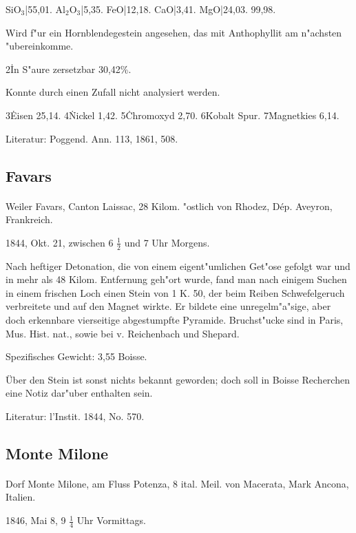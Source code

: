 \documentclass[a4paper, 11pt, oneside]{article}
\begin{document}
SiO$_{3}$|55,01.  
Al$_{2}$O$_{3}$|5,35.  
FeO|12,18.  
CaO|3,41.  
MgO|24,03.  
99,98. 

Wird f"ur ein Hornblendegestein angesehen, das mit Anthophyllit am n"achsten "ubereinkomme.

2\. In S"aure zersetzbar 30,42\%.

Konnte durch einen Zufall nicht analysiert werden.

3\. Eisen 25,14.  
4\. Nickel 1,42.  
5\. Chromoxyd 2,70.  
6\. Kobalt Spur.  
7\. Magnetkies 6,14.

\footnotesize
Literatur: Poggend. Ann. 113, 1861, 508.

\subsection{Favars}
\normalsize
\paragraph{}
Weiler Favars, Canton Laissac, 28 Kilom. "ostlich von Rhodez, Dép. Aveyron, Frankreich.

1844, Okt. 21, zwischen 6 $\frac{1}{2}$ und 7 Uhr Morgens.

Nach heftiger Detonation, die von einem eigent"umlichen Get"ose gefolgt war und in mehr als 48 Kilom. Entfernung geh"ort wurde, fand man nach einigem Suchen in einem frischen Loch einen Stein von 1 K. 50, der beim Reiben Schwefelgeruch verbreitete und auf den Magnet wirkte. Er bildete eine unregelm"a"sige, aber doch erkennbare vierseitige abgestumpfte Pyramide. Bruchst"ucke sind in Paris, Mus. Hist. nat., sowie bei v. Reichenbach und Shepard.

Spezifisches Gewicht: 3,55 Boisse.

Über den Stein ist sonst nichts bekannt geworden; doch soll in Boisse Recherchen eine Notiz dar"uber enthalten sein.

\footnotesize
Literatur: l'Instit. 1844, No. 570.

\subsection{Monte Milone}
\normalsize
\paragraph{}
Dorf Monte Milone, am Fluss Potenza, 8 ital. Meil. von Macerata, Mark Ancona, Italien.

1846, Mai 8, 9 $\frac{1}{4}$ Uhr Vormittags.
\end{document}
